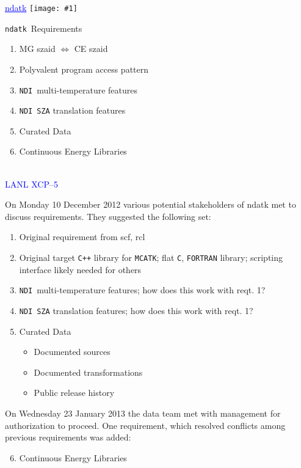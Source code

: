 \documentclass[clock]{slides}
\newenvironment{xslide}[1][logo.jpg]{\begin{slide} \tiny
\textcolor{blue}{\underline{ndatk}} \hfill
\texttt{[image: \#1]}
\normalsize}{\vfill\tiny
\textcolor{blue}{\hrulefill \\LANL XCP--5}
\end{slide}}
\newcommand{\ndatk}{\texttt{ndatk}}
\newcommand{\NDI}{\texttt{NDI}}
\begin{document}
\begin{xslide}
\begin{center}\large
\ndatk\ Requirements
\end{center}

\begin{enumerate}
\item MG szaid $\Leftrightarrow$ CE szaid
\item Polyvalent program access pattern
\item \NDI\ multi-temperature features
\item \NDI\ \texttt{SZA} translation features
\item Curated Data
\item Continuous Energy Libraries
\end{enumerate}
\end{xslide}

\begin{note}\small

On Monday 10 December 2012 various potential stakeholders of ndatk met
to discuss requirements.  They suggested the following set:  
\begin{enumerate}
\item Original requirement from scf, rcl
\item Original target \texttt{C++} library for \texttt{MCATK}; flat
  \texttt{C}, \texttt{FORTRAN} library;
  scripting interface likely needed for others
\item \NDI\ multi-temperature features; how does this work with reqt. 1?
\item \NDI\ \texttt{SZA} translation features; how does this work with
  reqt. 1?
\item Curated Data
  \begin{itemize}
    \item Documented sources
    \item Documented transformations
    \item Public release history
  \end{itemize}
\end{enumerate}

On Wednesday 23 January 2013 the data team met with management for
authorization to proceed.  One requirement, which resolved conflicts
among previous requirements was added:
\begin{enumerate}
\setcounter{enumi}{5}
\item Continuous Energy Libraries
\end{enumerate}

\end{note}
\end{document}

